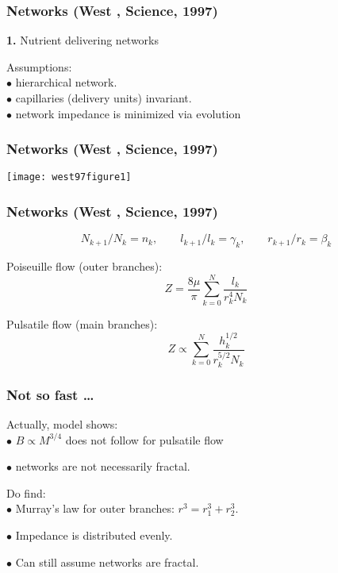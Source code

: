 \begin{frame}
  \frametitle{Networks {\tiny (West \etal, Science, 1997)}}

  \textbf{1.} Nutrient delivering networks 

  Assumptions:\\
  $\bullet$ hierarchical network.\\
  $\bullet$ capillaries (delivery units) invariant.\\
  $\bullet$ network impedance is minimized via evolution





\end{frame}

\begin{frame}
  \frametitle{Networks {\tiny (West \etal, Science, 1997)}}

\begin{center}
  \texttt{[image: west97figure1]}
\end{center}

\end{frame}

\begin{frame}
  \frametitle{Networks {\tiny (West \etal, Science, 1997)}}

  $$ N_{k+1}/N_k = n_k, 
  \qquad 
  l_{k+1}/l_k = \gamma_k, 
  \qquad
  r_{k+1}/r_k = \beta_k $$

  Poiseuille flow (outer branches):
  $$ Z = \frac{8\mu}{\pi} \sum_{k=0}^N \frac{l_k}{r_k^4 N_k} $$

  Pulsatile flow (main branches):
  $$ Z \propto \sum_{k=0}^N \frac{h_k^{1/2}}{r_k^{5/2} N_k} $$


\end{frame}

\begin{frame}
  \frametitle{Not so fast \ldots}

  Actually, model shows:\\
  $\bullet$ $B \propto M^{3/4}$ does not follow for pulsatile flow

  $\bullet$ networks are not necessarily fractal.

  \inv

  Do find:\\
  $\bullet$ Murray's law for outer branches: $r^{3} = r_1^{3} + r_2^{3}$.

  $\bullet$ Impedance is distributed evenly.
  
  $\bullet$ Can still assume networks are fractal.

\end{frame}

